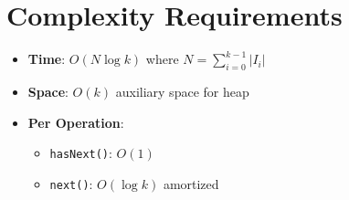 \documentclass[11pt]{article}
\begin{document}
\section{Complexity Requirements}

\begin{itemize}
    \item \textbf{Time}: $O(N \log k)$ where $N = \sum_{i=0}^{k-1} |I_i|$
    \item \textbf{Space}: $O(k)$ auxiliary space for heap
    \item \textbf{Per Operation}:
    \begin{itemize}
        \item \texttt{hasNext()}: $O(1)$
        \item \texttt{next()}: $O(\log k)$ amortized
    \end{itemize}
\end{itemize}
\end{document}
